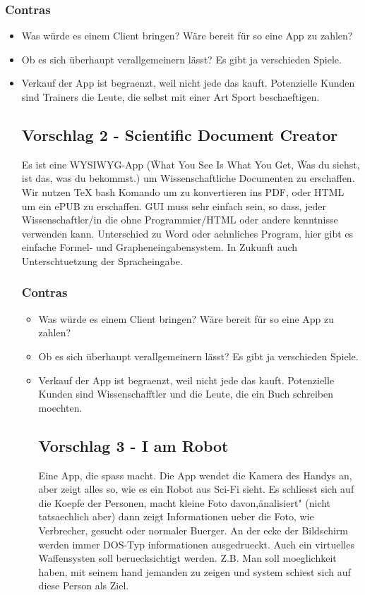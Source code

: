 \subsubsection{Contras}
\begin{itemize}
\item Was würde es einem Client bringen? Wäre bereit für so eine App zu zahlen?
\item Ob es sich überhaupt verallgemeinern lässt? Es gibt ja verschieden Spiele.
\item Verkauf der App ist begraenzt, weil nicht jede das kauft. Potenzielle Kunden sind Trainers die Leute, die selbst mit einer Art Sport beschaeftigen. 

\subsection{Vorschlag 2 - Scientific Document Creator}
Es ist eine WYSIWYG-App (\"What You See Is What You Get\“, \"Was du siehst, ist das, was du bekommst.\“) um Wissenschaftliche Documenten zu erschaffen. Wir nutzen TeX bash Komando um zu konvertieren ins PDF, oder HTML um ein ePUB zu erschaffen. GUI muss sehr einfach sein, so dass, jeder Wissenschaftler/in die ohne Programmier/HTML oder andere kenntnisse verwenden kann. Unterschied zu Word oder aehnliches Program, hier gibt es einfache Formel- und Grapheneingabensystem. In Zukunft auch Unterschtuetzung der Spracheingabe.

\vspace{0.2cm}

\subsubsection{Contras}
\begin{itemize}
\item Was würde es einem Client bringen? Wäre bereit für so eine App zu zahlen?
\item Ob es sich überhaupt verallgemeinern lässt? Es gibt ja verschieden Spiele.
\item Verkauf der App ist begraenzt, weil nicht jede das kauft. Potenzielle Kunden sind Wissenschafftler und die Leute, die ein Buch schreiben moechten.

\subsection{Vorschlag 3 - I am Robot}

Eine App, die spass macht. Die App wendet die Kamera des Handys an, aber zeigt alles so, wie es ein Robot aus Sci-Fi sieht. Es schliesst sich auf die Koepfe der Personen, macht kleine Foto davon,\"analisiert" (nicht tatsaechlich aber) dann zeigt Informationen ueber die Foto, wie Verbrecher, gesucht oder normaler Buerger. An der ecke der Bildschirm werden immer DOS-Typ informationen ausgedrueckt.
Auch ein virtuelles Waffensysten soll beruecksichtigt werden. Z.B. Man soll moeglichkeit haben, mit seinem hand jemanden zu zeigen und system schiest sich auf diese Person als Ziel.


\end{itemize}
\end{itemize}

